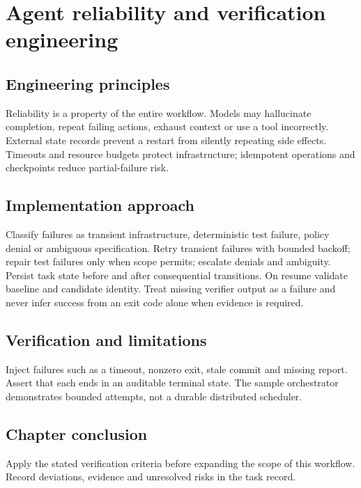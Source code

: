 \chapter{Agent reliability and verification engineering}

\section{Engineering principles}

Reliability is a property of the entire workflow. Models may hallucinate completion, repeat failing actions, exhaust context or use a tool incorrectly. External state records prevent a restart from silently repeating side effects. Timeouts and resource budgets protect infrastructure; idempotent operations and checkpoints reduce partial-failure risk.

\section{Implementation approach}

Classify failures as transient infrastructure, deterministic test failure, policy denial or ambiguous specification. Retry transient failures with bounded backoff; repair test failures only when scope permits; escalate denials and ambiguity. Persist task state before and after consequential transitions. On resume validate baseline and candidate identity. Treat missing verifier output as a failure and never infer success from an exit code alone when evidence is required.

\section{Verification and limitations}

Inject failures such as a timeout, nonzero exit, stale commit and missing report. Assert that each ends in an auditable terminal state. The sample orchestrator demonstrates bounded attempts, not a durable distributed scheduler.

\section{Chapter conclusion}

Apply the stated verification criteria before expanding the scope of this workflow. Record deviations, evidence and unresolved risks in the task record.
